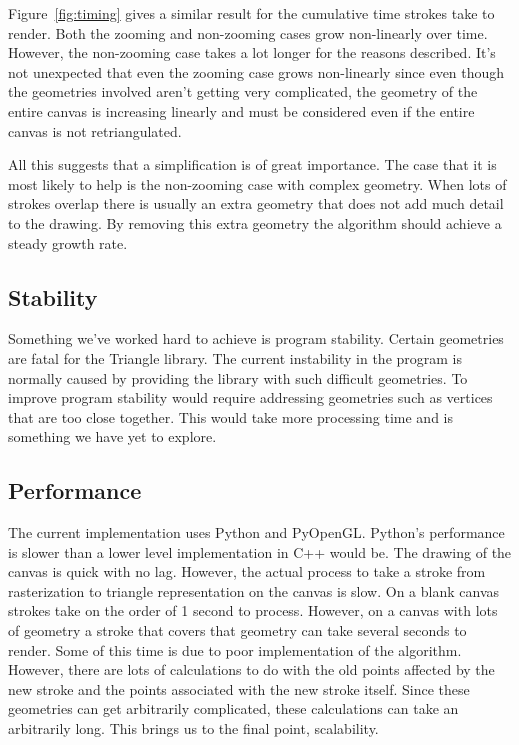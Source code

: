 \documentclass[review]{acmsiggraph}
\begin{document}
Figure~\ref{fig:timing} gives a similar result for the cumulative time strokes take to render. Both
the zooming and non-zooming cases grow non-linearly over time. However, the non-zooming case takes
a lot longer for the reasons described. It's not unexpected that even the zooming case grows non-linearly
since even though the geometries involved aren't getting very complicated, the geometry of the entire
canvas is increasing linearly and must be considered even if the entire canvas is not retriangulated.

All this suggests that a simplification is of great importance.
The case that it is most likely to help is the non-zooming case with complex geometry. When lots of strokes
overlap there is usually an extra geometry that does not add much detail to the drawing. By removing
this extra geometry the algorithm should achieve a steady growth rate.

\subsection{Stability}
Something we've worked hard to achieve is program stability. Certain geometries are fatal
for the Triangle library. The current instability in the program is normally caused by
providing the library with such difficult geometries. To improve program stability would
require addressing geometries such as vertices that are too close together. This would
take more processing time and is something we have yet to explore.

\subsection{Performance}
The current implementation uses Python and PyOpenGL. Python's performance is slower than
a lower level implementation in C++ would be. The drawing of the canvas is quick with
no lag. However, the actual process to take a stroke from rasterization to triangle
representation on the canvas is slow. On a blank canvas strokes take on the order of
1 second to process. However, on a canvas with lots of geometry a stroke that covers
that geometry can take several seconds to render. Some of this time is due to poor
implementation of the algorithm. However, there are lots of calculations
to do with the old points affected by the new stroke and the points associated with the
new stroke itself. Since these geometries can get arbitrarily complicated, these
calculations can take an arbitrarily long. This brings us to the final point, scalability.
\end{document}
